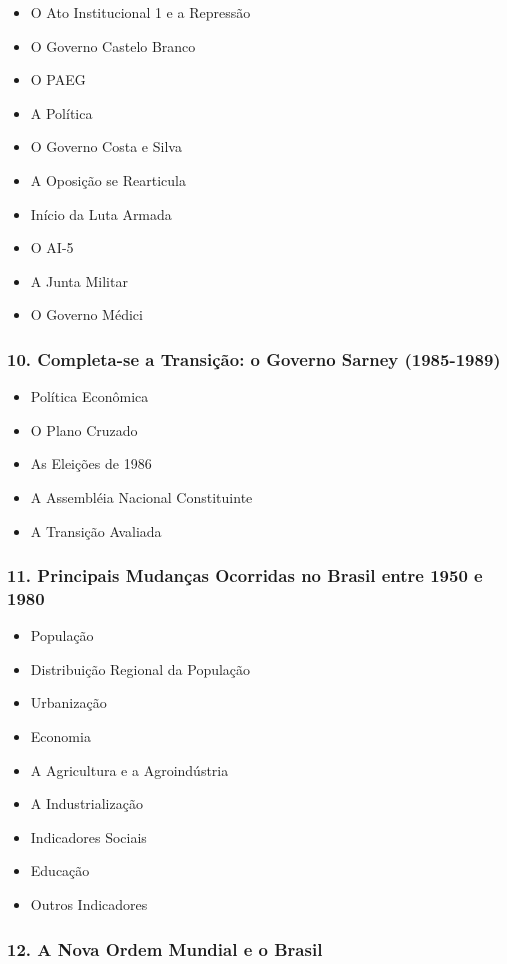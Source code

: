 \documentclass[a4paper,12pt]{article}[abntex2]
\begin{document}
\begin{itemize}
\item O Ato Institucional 1 e a Repressão
\item O Governo Castelo Branco
\item O PAEG
\item A Política
\item O Governo Costa e Silva
\item A Oposição se Rearticula
\item Início da Luta Armada
\item O AI-5
\item A Junta Militar
\item O Governo Médici
\end{itemize}
\subsubsection*{10. Completa-se a Transição: o Governo Sarney (1985-1989)}

\begin{itemize}
\item Política Econômica
\item O Plano Cruzado
\item As Eleições de 1986
\item A Assembléia Nacional Constituinte
\item A Transição Avaliada
\end{itemize}
\subsubsection*{11. Principais Mudanças Ocorridas no Brasil entre 1950 e 1980}

\begin{itemize}
\item População
\item Distribuição Regional da População
\item Urbanização
\item Economia
\item A Agricultura e a Agroindústria
\item A Industrialização
\item Indicadores Sociais
\item Educação
\item Outros Indicadores
\end{itemize}
\subsubsection*{12. A Nova Ordem Mundial e o Brasil}
\end{document}
